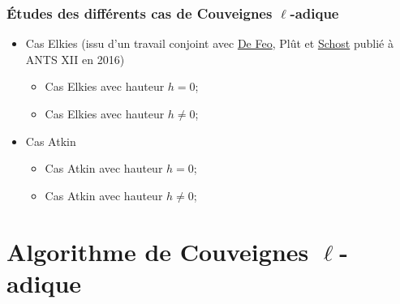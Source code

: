 \documentclass[10pt,a4paper]{beamer}
\theoremstyle{plain}
\theoremstyle{definition}
\theoremstyle{definition}
\theoremstyle{definition}
\theoremstyle{definition}
\theoremstyle{remark}
\theoremstyle{remark}
\theoremstyle{definition}
\begin{document}
\begin{frame}
\frametitle{Études des différents cas de Couveignes $\ell$-adique}
\vfill
\begin{itemize}
\item Cas Elkies (issu d'un travail conjoint avec \href{http://defeo.lu/}{De Feo}, Plût et \href{https://cs.uwaterloo.ca/~eschost/}{Schost} publié à ANTS XII en 2016)
\begin{itemize}
\vfill
\item Cas Elkies avec hauteur $h=0$;
\vfill
\item Cas Elkies avec hauteur $h \neq 0$;
\end{itemize}
\vfill
\item Cas Atkin
\begin{itemize}
\vfill 
\item Cas Atkin avec hauteur $h=0$;
\vfill
\item Cas Atkin avec hauteur $h \neq 0$;
\end{itemize}
\end{itemize}
\vfill

\end{frame}





\section{Algorithme de Couveignes $\ell$-adique}
\end{document}
